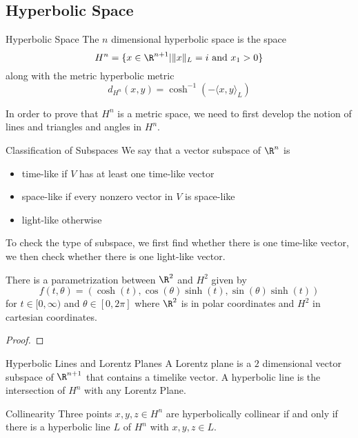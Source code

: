\documentclass[a4paper]{article}
\begin{document}
\subsection{Hyperbolic Space}
\begin{defn}{Hyperbolic Space}{} The $n$ dimensional hyperbolic space is the space $$H^n=\{x\in\R^{n+1}|\|x\|_L=i\text{ and }x_1>0\}$$ along with the metric hyperbolic metric $$d_{H^n}(x,y)=\cosh^{-1}(-\langle x,y\rangle_L)$$
\end{defn}

In order to prove that $H^n$ is a metric space, we need to first develop the notion of lines and triangles and angles in $H^n$. 

\begin{defn}{Classification of Subspaces}{} We say that a vector subspace of $\R^n$ is 
\begin{itemize}
\item time-like if $V$ has at least one time-like vector
\item space-like if every nonzero vector in $V$ is space-like
\item light-like otherwise
\end{itemize}
\end{defn}

To check the type of subspace, we first find whether there is one time-like vector, we then check whether there is one light-like vector. 

\begin{prp}{}{} There is a parametrization between $\R^2$ and $H^2$ given by $$f(t,\theta)=(\cosh(t),\cos(\theta)\sinh(t),\sin(\theta)\sinh(t))$$ for $t\in[0,\infty)$ and $\theta\in[0,2\pi]$ where $\R^2$ is in polar coordinates and $H^2$ in cartesian coordinates. \tcbline
\begin{proof}

\end{proof}
\end{prp}

\begin{defn}{Hyperbolic Lines and Lorentz Planes}{} A Lorentz plane is a $2$ dimensional vector subspace of $\R^{n+1}$ that contains a timelike vector. A hyperbolic line is the intersection of $H^n$ with any Lorentz Plane. 
\end{defn}

\begin{defn}{Collinearity}{} Three points $x,y,z\in H^n$ are hyperbolically collinear if and only if there is a hyperbolic line $L$ of $H^n$ with $x,y,z\in L$. 
\end{defn}
\end{document}
